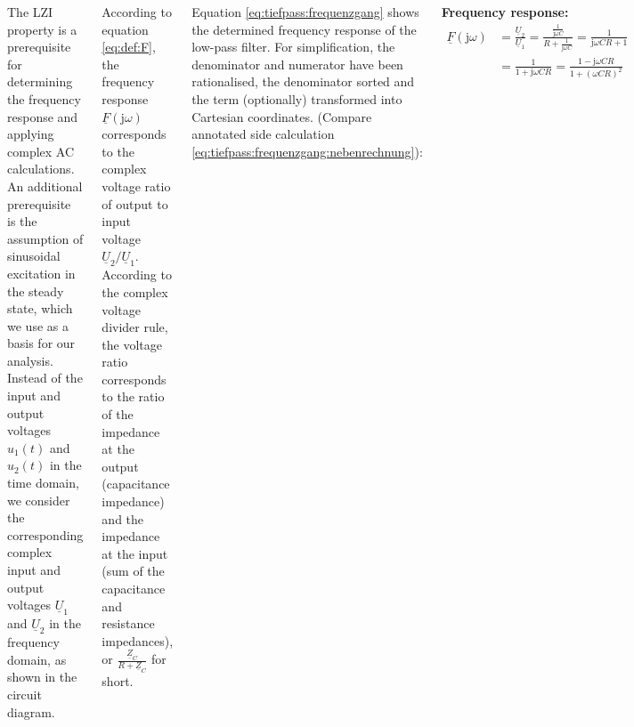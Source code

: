 \begin{frame}[t]
\begin{columns}[T]
{        The LZI property is a prerequisite for determining the frequency response and applying complex AC calculations.
        An additional prerequisite is the assumption of sinusoidal excitation in the steady state, which we use as a basis for our analysis.       
        Instead of the input and output voltages $u_1(t)$ and $u_2(t)$ in the time domain, we consider the corresponding 
        complex input and output voltages $\underline{U}_1$ and $\underline{U}_2$ in the frequency domain, as shown in the circuit diagram.

        According to equation \ref{eq:def:F}, the frequency response $\underline{F}(\mathrm{j}\omega)$ corresponds to 
        the complex voltage ratio of output to input voltage $\underline{U}_2/\underline{U}_1$.
        According to the complex voltage divider rule, the voltage ratio corresponds to the ratio of the impedance at the output (capacitance impedance) and 
        the impedance at the input (sum of the capacitance and resistance impedances), or $\frac{\underline{Z}_C}{R + \underline{Z}_C}$ for short.

        Equation \ref{eq:tiefpass:frequenzgang} shows the determined frequency response of the low-pass filter.
        For simplification, the denominator and numerator have been rationalised, the denominator sorted and the term
        (optionally) transformed into Cartesian coordinates. (Compare annotated side calculation \ref{eq:tiefpass:frequenzgang:nebenrechnung}):

    }%
    \b{%
        \textbf{Frequency response:}%
        \begin{align*}%
            \underline{F}(\mathrm{j}\omega)   & = \frac{\underline{U}_2}{\underline{U}_1} 
                                    = \frac{\frac{1}{\mathrm{j}\omega C}}{R + \frac{1}{\mathrm{j}\omega C}}
                                    = \frac{1}{\mathrm{j}\omega CR + 1} \\
                                    & = \frac{1}{1 + \mathrm{j}\omega CR}
                                    = \frac{1 - \mathrm{j}\omega CR}{1 + (\omega CR)^2}
        \end{align*}%
        \pause%
    }%


\end{columns}
\end{frame}
